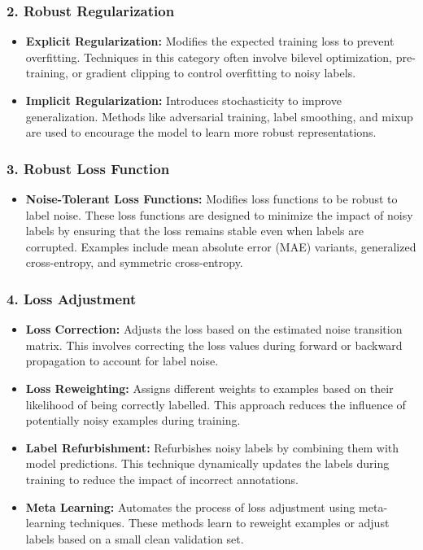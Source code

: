 \subsubsection*{2. Robust Regularization}
\begin{itemize}
    \item \textbf{Explicit Regularization:} Modifies the expected training loss to prevent overfitting. Techniques in this category often involve bilevel optimization, pre-training, or gradient clipping to control overfitting to noisy labels.
    \item \textbf{Implicit Regularization:} Introduces stochasticity to improve generalization. Methods like adversarial training, label smoothing, and mixup are used to encourage the model to learn more robust representations.
\end{itemize}

\subsubsection*{3. Robust Loss Function}
\begin{itemize}
    \item \textbf{Noise-Tolerant Loss Functions:} Modifies loss functions to be robust to label noise. These loss functions are designed to minimize the impact of noisy labels by ensuring that the loss remains stable even when labels are corrupted. Examples include mean absolute error (MAE) variants, generalized cross-entropy, and symmetric cross-entropy.
\end{itemize}

\subsubsection*{4. Loss Adjustment}
\label{subsubsec:loss_adjust}
\begin{itemize}
    \item \textbf{Loss Correction:} Adjusts the loss based on the estimated noise transition matrix. This involves correcting the loss values during forward or backward propagation to account for label noise.
    \item \textbf{Loss Reweighting:} Assigns different weights to examples based on their likelihood of being correctly labelled. This approach reduces the influence of potentially noisy examples during training.
    \item \textbf{Label Refurbishment:} Refurbishes noisy labels by combining them with model predictions. This technique dynamically updates the labels during training to reduce the impact of incorrect annotations.
    \item \textbf{Meta Learning:} Automates the process of loss adjustment using meta-learning techniques. These methods learn to reweight examples or adjust labels based on a small clean validation set.
\end{itemize}

